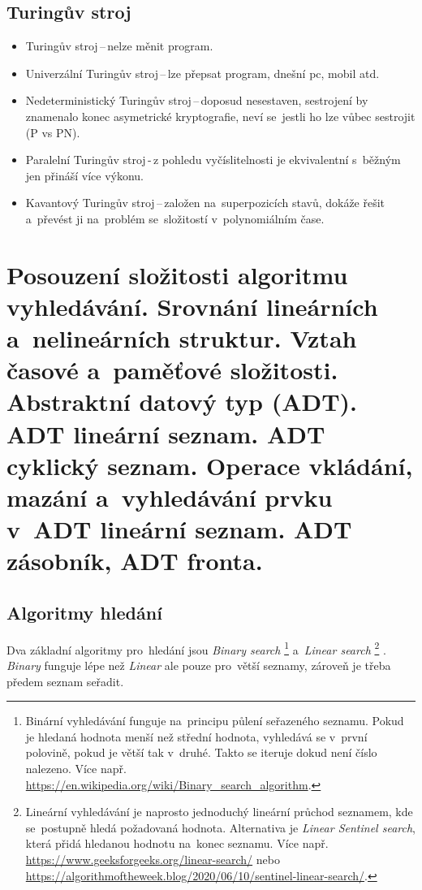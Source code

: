 \subsection{Turingův stroj}

\begin{itemize}[noitemsep]
	\item Turingův stroj\,--\,nelze měnit program.
	\item Univerzální Turingův stroj\,--\,lze přepsat program, dnešní pc, mobil atd.
	\item Nedeterministický Turingův stroj\,--\,doposud nesestaven, sestrojení by znamenalo konec asymetrické kryptografie, neví se~jestli ho lze vůbec sestrojit (P vs PN).
	\item Paralelní Turingův stroj\,-\,z pohledu vyčíslitelnosti je ekvivalentní s~běžným jen přináší více výkonu.
	\item Kavantový Turingův stroj\,--\,založen na~superpozicích stavů, dokáže řešit  a~převést ji na~problém se~složitostí v~polynomiálním čase.
\end{itemize}

\clearpage
\section{Posouzení složitosti algoritmu vyhledávání. Srovnání lineárních a~nelineárních struktur. Vztah časové a~paměťové složitosti. Abstraktní datový typ (ADT). ADT lineární seznam. ADT cyklický seznam. Operace vkládání, mazání a~vyhledávání prvku v~ADT lineární seznam. ADT zásobník, ADT fronta.}

\subsection{Algoritmy hledání}

Dva základní algoritmy pro~hledání jsou \textit{Binary search}%
\footnote{Binární vyhledávání funguje na~principu půlení seřazeného seznamu. Pokud je hledaná hodnota menší než střední hodnota, vyhledává se v~první polovině, pokud je větší tak v~druhé. Takto se iteruje dokud není číslo nalezeno. Více např. \url{https://en.wikipedia.org/wiki/Binary_search_algorithm}.} %
a~\textit{Linear search}%
\footnote{Lineární vyhledávání je naprosto jednoduchý lineární průchod seznamem, kde se~postupně hledá požadovaná hodnota. Alternativa je \emph{Linear Sentinel search}, která přidá hledanou hodnotu na~konec seznamu. Více např. \url{https://www.geeksforgeeks.org/linear-search/} nebo \url{https://algorithmoftheweek.blog/2020/06/10/sentinel-linear-search/}.}%
. \textit{Binary} funguje lépe než \textit{Linear} ale pouze pro~větší seznamy, zároveň je třeba předem seznam seřadit.

